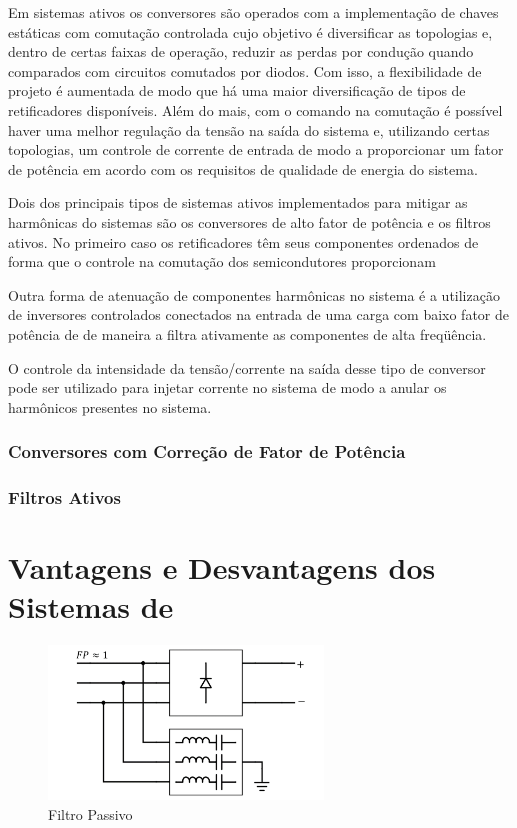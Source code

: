 Em sistemas ativos os conversores são operados com a implementação de chaves estáticas com comutação controlada cujo objetivo é diversificar as topologias e, dentro de certas faixas de operação, reduzir as perdas por condução quando comparados com circuitos comutados por diodos. Com isso, a flexibilidade de projeto é aumentada de modo que há uma maior diversificação de tipos de retificadores disponíveis. Além do mais, com o comando na comutação é possível haver uma melhor regulação da tensão na saída do sistema e, utilizando certas topologias, um controle de corrente de entrada de modo a proporcionar um fator de potência em acordo com os requisitos de qualidade de energia do sistema.

Dois dos principais tipos de sistemas ativos implementados para mitigar as harmônicas do sistemas são os conversores de alto fator de potência e os filtros ativos. No primeiro caso os retificadores têm seus componentes ordenados de forma que o controle na comutação dos semicondutores proporcionam 

Outra forma de atenuação de componentes harmônicas no sistema é a utilização de inversores controlados conectados na entrada de uma carga com baixo fator de potência de de maneira a filtra ativamente as componentes de alta freqüência. 

O controle da intensidade da tensão/corrente na saída desse tipo de conversor pode ser utilizado para injetar corrente no sistema de modo a anular os harmônicos presentes no sistema.

\subsubsection{Conversores com Correção de Fator de Potência}

\subsubsection{Filtros Ativos}

\section{Vantagens e Desvantagens dos Sistemas de }

\begin{figure}[!htbp]
	\centering
	\includegraphics[width=0.65\textwidth]{Cap2/Figuras/sch_filtro_passivo.png}
	\caption{Filtro Passivo}
	\label{fig:sch_filtro_passivo}
\end{figure}

